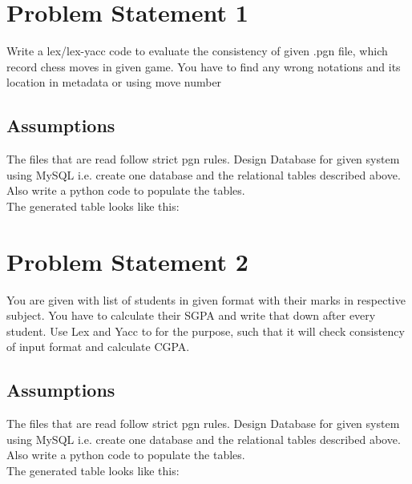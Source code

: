 \documentclass[11pt]{report}
\begin{document}
\section{Problem Statement 1}
Write a lex/lex-yacc code to evaluate the consistency of given .pgn file, which record chess moves in given game. You have to find any wrong notations and its location in metadata or using move number\\
	
\subsection{Assumptions}
The files that are read follow strict pgn rules.
Design Database for given system using MySQL i.e. create one database and the relational tables described above. Also write a python code to populate the tables.\\
The generated table looks like this:\\
\section{Problem Statement 2}
You are given with list of students in given format with their marks in respective subject. You have to calculate their SGPA and write that down after every student. Use Lex and Yacc to for the purpose, such that it will check consistency of input format and calculate CGPA.\\
	
\subsection{Assumptions}
The files that are read follow strict pgn rules.
Design Database for given system using MySQL i.e. create one database and the relational tables described above. Also write a python code to populate the tables.\\
The generated table looks like this:\\
\end{document}
